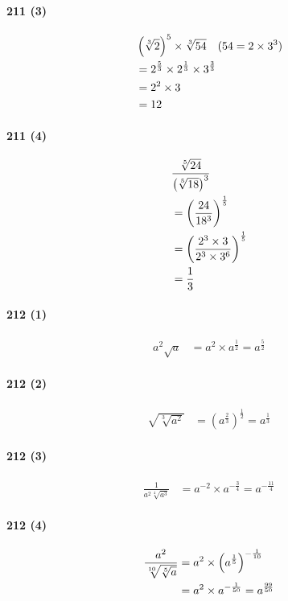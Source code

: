 \documentclass[fleqn,a4j,dvipdfmx,uplatex,twocolumn]{jsarticle}
\def\nr{\notag\\}%
\begin{document}
\paragraph{211 (3)}
\begin{align*}
  &\left(\sqrt[3]{2}\right)^5 \times \sqrt[3]{54} \quad (54 = 2 \times 3^3) \nr
  &= 2^{\frac{5}{3}} \times 2^{\frac{1}{3}} \times 3^{\frac{3}{3}} \nr
  &= 2^2 \times 3 \nr
  &= 12
\end{align*}

\paragraph{211 (4)}
\begin{align*}
  &\frac{\sqrt[5]{24}}{\left(\sqrt[5]{18}\right)^3} \nr
  &= \left(\frac{24}{18^3}\right)^{\frac{1}{5}} \nr
  &= \left(\frac{2^3 \times 3}{2^3 \times 3^6}\right)^{\frac{1}{5}} \nr
  &= \frac{1}{3}
\end{align*}

\paragraph{212 (1)}
\begin{align*}
  a^2\sqrt{a} &= a^2 \times a^{\frac{1}{2}} = a^{\frac{5}{2}}
\end{align*}

\paragraph{212 (2)}
\begin{align*}
  \sqrt{\sqrt[3]{a^2}} &= \left(a^{\frac{2}{3}}\right)^{\frac{1}{2}} = a^{\frac{1}{3}}
\end{align*}

\paragraph{212 (3)}
\begin{align*}
  \frac{1}{a^2\sqrt[4]{a^3}} &= a^{-2} \times a^{-\frac{3}{4}} = a^{-\frac{11}{4}}
\end{align*}

\paragraph{212 (4)}
\begin{align*}
  \frac{a^2}{\sqrt[10]{\sqrt[5]{a}}} &= a^2 \times \left(a^{\frac{1}{5}}\right)^{-\frac{1}{10}} \nr
  &= a^2 \times a^{-\frac{1}{50}} = a^{\frac{99}{50}}
\end{align*}
\end{document}
